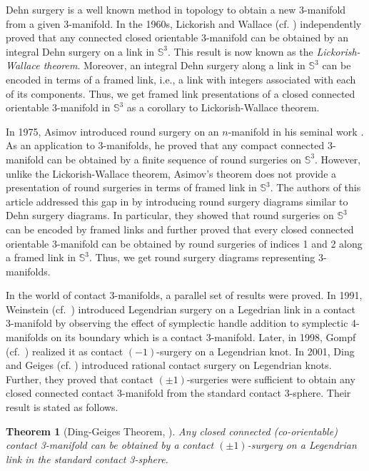 \documentclass{amsart}
\theoremstyle{plain}
\newtheorem{thm}{Theorem}
\theoremstyle{remark}
\theoremstyle{definition}
\newcommand{\s}{\mathbb{S}}
\begin{document}
Dehn surgery is a well known method in topology to obtain a new 3-manifold from a given 3-manifold.
In the 1960s, Lickorish and Wallace (cf.  \cite{L, W}) independently proved that any connected closed orientable 3-manifold can be obtained by an integral Dehn surgery on a link in $\s^3$. 
This result is now known as the \textit{Lickorish-Wallace theorem}. 
Moreover, an integral Dehn surgery along a link in $\s^3$ can be encoded in terms of a framed link, i.e., a link with integers associated with each of its components.
Thus, we get framed link presentations of a closed connected orientable 3-manifold in $\s^3$ as a corollary to Lickorish-Wallace theorem. 

In 1975, Asimov introduced round surgery on an $n$-manifold in his seminal work \cite{Asimov}. 
As an application to 3-manifolds, he proved that any compact connected 3-manifold can be obtained by a finite sequence of round surgeries on $\s^3$. 
However, unlike the Lickorish-Wallace theorem, Asimov's theorem does not provide a presentation of round surgeries in terms of framed link in $\s^3$. 
The authors of this article addressed this gap in \cite{PD-RSD} by introducing round surgery diagrams similar to Dehn surgery diagrams. 
In particular, they showed that round surgeries on $\s^3$ can be encoded by framed links and further proved that every closed connected orientable 3-manifold can be obtained by round surgeries of indices 1 and 2 along a framed link in $\s^3$. 
Thus, we get round surgery diagrams representing 3-manifolds.  

In the world of contact 3-manifolds, a parallel set of results were proved.
In 1991, Weinstein (cf.~\cite{Weinstein}) introduced Legendrian surgery on a Legedrian link in a contact 3-manifold by observing the effect of symplectic handle addition to symplectic 4-manifolds on its boundary which is a contact 3-manifold. 
Later, in 1998, Gompf (cf.~\cite{Gompf-HBC_SteinSurface}) realized it as contact $(-1)$-surgery on a Legendrian knot. 
In 2001, Ding and Geiges (cf. \cite{DG-SymplecticFillings})  introduced rational contact surgery on Legendrian knots. 
Further, they proved that contact $(\pm1)$-surgeries were sufficient to obtain any closed connected contact 3-manifold from the standard contact 3-sphere. 
Their result is stated as follows. 
\begin{thm}[Ding-Geiges Theorem, \cite{DG}]\label{thm: LegPresnthm}
    Any closed connected (co-orientable) contact 3-manifold can be obtained by a contact $(\pm1)$-surgery on a Legendrian link in the standard contact 3-sphere.  
\end{thm}
\end{document}
